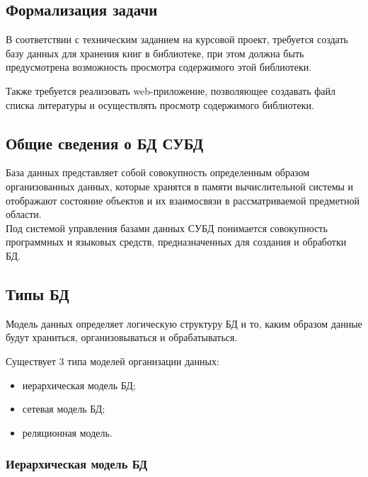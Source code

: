 \subsection*{Формализация задачи}%

В соответствии с техническим заданием на курсовой проект, требуется создать базу данных для хранения книг в библиотеке, при этом должна быть предусмотрена возможность просмотра содержимого этой библиотеки.

Также требуется реализовать web-приложение, позволяющее создавать файл списка литературы и осуществлять просмотр содержимого библиотеки.

\subsection*{Общие сведения о БД  СУБД}%
База данных представляет собой совокупность определенным образом организованных данных, которые хранятся в памяти вычислительной системы и отображают состояние объектов и их взаимосвязи в рассматриваемой предметной области.\\
Под системой управления базами данных \(СУБД\) понимается совокупность программных и языковых средств, предназначенных для создания и обработки БД. 

\subsection*{Типы БД}

Модель данных определяет логическую структуру БД и то, каким образом данные будут храниться, организовываться и обрабатываться. 

Существует 3 типа моделей организации данных:
\begin{itemize}
	\item иерархическая модель БД;
	\item сетевая модель БД;
	\item реляционная модель.
\end{itemize}

\subsubsection*{Иерархическая модель БД}

